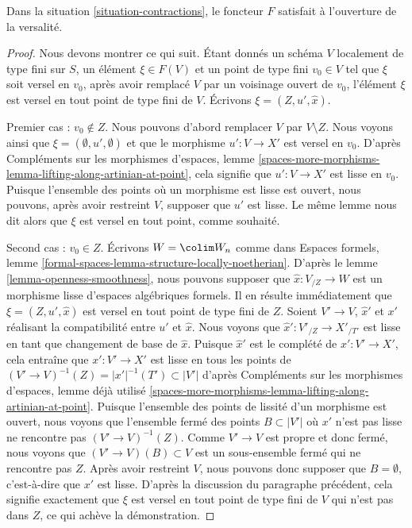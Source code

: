 \begin{lemma}
\label{lemma-openness-versality}
Dans la situation \ref{situation-contractions}, le foncteur
$F$ satisfait à l'ouverture de la versalité.
\end{lemma}

\begin{proof}
Nous devons montrer ce qui suit. Étant donnés un schéma $V$ localement de type fini sur
$S$, un élément $\xi \in F(V)$ et un point de type fini $v_0 \in V$ tel que
$\xi$ soit versel en $v_0$, après avoir remplacé $V$ par un voisinage ouvert
de $v_0$, l'élément $\xi$ est versel en tout point de type fini de $V$.
Écrivons $\xi = (Z, u', \hat x)$.

\medskip\noindent
Premier cas : $v_0 \not \in Z$. Nous pouvons d'abord remplacer $V$ par
$V \setminus Z$. Nous voyons ainsi que $\xi = (\emptyset, u', \emptyset)$
et que le morphisme $u' : V \to X'$ est versel en $v_0$.
D'après Compléments sur les morphismes d'espaces, lemme
\ref{spaces-more-morphisms-lemma-lifting-along-artinian-at-point},
cela signifie que $u' : V \to X'$ est lisse en $v_0$.
Puisque l'ensemble des points où un morphisme est lisse est ouvert,
nous pouvons, après avoir restreint $V$, supposer que $u'$ est lisse.
Le même lemme nous dit alors que $\xi$ est versel en tout
point, comme souhaité.

\medskip\noindent
Second cas : $v_0 \in Z$. Écrivons $W = \colim W_n$ comme dans
Espaces formels, lemme \ref{formal-spaces-lemma-structure-locally-noetherian}.
D'après le lemme \ref{lemma-openness-smoothness}, nous pouvons supposer que $\hat x : V_{/Z} \to W$
est un morphisme lisse d'espaces algébriques formels. Il en résulte immédiatement
que $\xi = (Z, u', \hat x)$ est versel en tout point de type fini de $Z$.
Soient $V' \to V$, $\hat x'$ et $x'$ réalisant la compatibilité entre $u'$
et $\hat x$. Nous voyons que $\hat x' : V'_{/Z} \to X'_{/T'}$ est lisse en tant que
changement de base de $\hat x$. Puisque $\hat x'$ est le complété de
$x' : V' \to X'$, cela entraîne que $x' : V' \to X'$ est lisse en tous les
points de $(V' \to V)^{-1}(Z) = |x'|^{-1}(T') \subset |V'|$
d'après Compléments sur les morphismes d'espaces, lemme déjà utilisé
\ref{spaces-more-morphisms-lemma-lifting-along-artinian-at-point}.
Puisque l'ensemble des points de lissité d'un morphisme est ouvert, nous voyons que
l'ensemble fermé des points $B \subset |V'|$ où $x'$ n'est pas lisse
ne rencontre pas $(V' \to V)^{-1}(Z)$. Comme $V' \to V$ est propre et
donc fermé, nous voyons que $(V' \to V)(B) \subset V$ est un sous-ensemble fermé
qui ne rencontre pas $Z$. Après avoir restreint $V$, nous pouvons donc supposer que
$B = \emptyset$, c'est-à-dire que $x'$ est lisse. D'après la discussion du paragraphe
précédent, cela signifie exactement que $\xi$ est versel en tout point de type fini
de $V$ qui n'est pas dans $Z$, ce qui achève la démonstration.
\end{proof}

